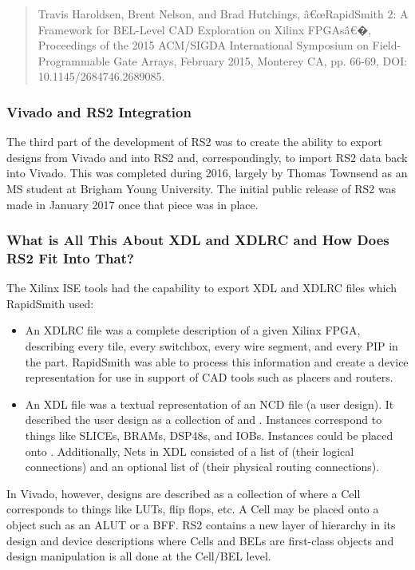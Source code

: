 \begin{quotation}Travis Haroldsen, Brent Nelson, and Brad Hutchings, â€œRapidSmith
2:
A Framework for BEL-Level CAD Exploration on Xilinx FPGAsâ€�, Proceedings of the
2015 ACM/SIGDA International Symposium on Field-Programmable Gate Arrays,
February 2015, Monterey CA, pp. 66-69, DOI: 10.1145/2684746.2689085.
\end{quotation}

\subsubsection{Vivado and RS2 Integration}
The third part of the development of RS2 was to create the ability to export
designs from Vivado and into RS2 and, correspondingly, to import RS2 data back
into Vivado.  This was completed during 2016, largely by Thomas Townsend
as an MS student at Brigham Young University.  The initial
public release of RS2 was made in January 2017 once that piece was in place.

\subsubsection{What is All This About XDL and XDLRC and How Does RS2 Fit Into
That?} 
The Xilinx ISE tools had the capability to export XDL and XDLRC files which
RapidSmith used: 
\begin{itemize}
  \item An XDLRC file was a complete description of a given Xilinx FPGA,
  describing every tile, every switchbox, every wire segment, and every PIP in
  the part.  RapidSmith was able to process this information and create a device
  representation for use in support of CAD tools such as placers and routers.
  \item An XDL file was a textual representation of an NCD file (a user design).
  It described the user design as a collection of  and . Instances
  correspond to things like {SLICEs}, {BRAMs}, {DSP48s}, and {IOBs}.  Instances could be
  placed onto . Additionally, Nets in XDL consisted of a list of
   (their logical connections) and an optional list of  (their physical
  routing connections).
\end{itemize}
In Vivado, however, designs are described as a collection of  where a Cell
corresponds to things like LUTs, flip flops, etc.  A Cell may be placed
onto a  object such as an ALUT or a BFF.  RS2 contains a new layer of
hierarchy in its design and device descriptions where Cells and BELs are first-class objects and
design manipulation is all done at the Cell/BEL level.

